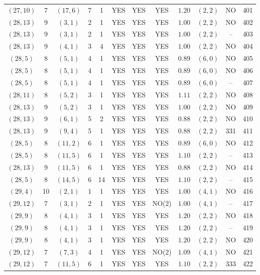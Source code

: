 \begin{longtable}{|c|c|c|c|c|c|c|c|c|c|c|c|}
$(27,10)$ & 7 & $(17,6)$ & 7 & 1 & YES & YES & YES & $1.20$ & $(2,2)$ & NO & 401\\
$(28,13)$ & 9 & $(3,1)$ & 2 & 1 & YES & YES & YES & $1.00$ & $(2,2)$ & NO & 402\\
$(28,13)$ & 9 & $(3,1)$ & 2 & 1 & YES & YES & YES & $1.00$ & $(2,2)$ & -- & 403\\
$(28,13)$ & 9 & $(4,1)$ & 3 & 4 & YES & YES & YES & $1.00$ & $(2,2)$ & NO & 404\\
$(28,5)$ & 8 & $(5,1)$ & 4 & 1 & YES & YES & YES & $0.89$ & $(6,0)$ & NO & 405\\
$(28,5)$ & 8 & $(5,1)$ & 4 & 1 & YES & YES & YES & $0.89$ & $(6,0)$ & NO & 406\\
$(28,5)$ & 8 & $(5,1)$ & 4 & 1 & YES & YES & YES & $0.89$ & $(6,0)$ & -- & 407\\
$(28,11)$ & 8 & $(5,2)$ & 3 & 1 & YES & YES & YES & $1.11$ & $(2,2)$ & NO & 408\\
$(28,13)$ & 9 & $(5,2)$ & 3 & 1 & YES & YES & YES & $1.00$ & $(2,2)$ & NO & 409\\
$(28,13)$ & 9 & $(6,1)$ & 5 & 2 & YES & YES & YES & $0.88$ & $(2,2)$ & NO & 410\\
$(28,13)$ & 9 & $(9,4)$ & 5 & 1 & YES & YES & YES & $0.88$ & $(2,2)$ & 331 & 411\\
$(28,5)$ & 8 & $(11,2)$ & 6 & 1 & YES & YES & YES & $0.89$ & $(6,0)$ & NO & 412\\
$(28,5)$ & 8 & $(11,5)$ & 6 & 1 & YES & YES & YES & $1.10$ & $(2,2)$ & -- & 413\\
$(28,13)$ & 9 & $(11,5)$ & 6 & 1 & YES & YES & YES & $0.88$ & $(2,2)$ & NO & 414\\
$(28,5)$ & 8 & $(14,5)$ & 6 & 14 & YES & YES & YES & $1.10$ & $(2,2)$ & -- & 415\\
$(29,4)$ & 10 & $(2,1)$ & 1 & 1 & YES & YES & YES & $1.00$ & $(4,1)$ & NO & 416\\
$(29,12)$ & 7 & $(3,1)$ & 2 & 1 & YES & YES & NO(2) & $1.00$ & $(4,1)$ & -- & 417\\
$(29,9)$ & 8 & $(4,1)$ & 3 & 1 & YES & YES & YES & $1.20$ & $(2,2)$ & NO & 418\\
$(29,9)$ & 8 & $(4,1)$ & 3 & 1 & YES & YES & YES & $1.20$ & $(2,2)$ & -- & 419\\
$(29,9)$ & 8 & $(4,1)$ & 3 & 1 & YES & YES & YES & $1.20$ & $(2,2)$ & NO & 420\\
$(29,12)$ & 7 & $(7,3)$ & 4 & 1 & YES & YES & NO(2) & $1.09$ & $(4,1)$ & NO & 421\\
$(29,12)$ & 7 & $(11,5)$ & 6 & 1 & YES & YES & YES & $1.10$ & $(2,2)$ & 333 & 422\\

\end{longtable}
